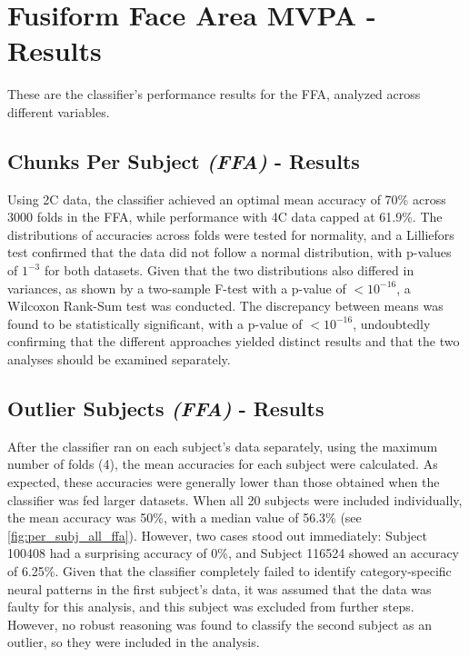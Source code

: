 \section{Fusiform Face Area MVPA - Results}

These are the classifier's performance results for the \gls{FFA}, analyzed across different variables.

\subsection{Chunks Per Subject \textit{(FFA)} - Results}

Using \gls{2C} data, the classifier achieved an optimal mean accuracy of 70\% across 3000 folds in the \gls{FFA}, while performance with \gls{4C} data capped at 61.9\%. The distributions of accuracies across folds were tested for normality, and a Lilliefors test confirmed that the data did not follow a normal distribution, with p-values of $1^{-3}$ for both datasets. Given that the two distributions also differed in variances, as shown by a two-sample F-test with a p-value of $<10^{-16}$, a Wilcoxon Rank-Sum test was conducted. The discrepancy between means was found to be statistically significant, with a p-value of $<10^{-16}$, undoubtedly confirming that the different approaches yielded distinct results and that the two analyses should be examined separately.

\subsection{Outlier Subjects \textit{(FFA)} - Results}
\label{subs:res_outliers_ffa}

After the classifier ran on each subject's data separately, using the maximum number of folds (4), the mean accuracies for each subject were calculated. As expected, these accuracies were generally lower than those obtained when the classifier was fed larger datasets. When all 20 subjects were included individually, the mean accuracy was 50\%, with a median value of 56.3\% (see \autoref{fig:per_subj_all_ffa}). However, two cases stood out immediately: Subject 100408 had a surprising accuracy of 0\%, and Subject 116524 showed an accuracy of 6.25\%. Given that the classifier completely failed to identify category-specific neural patterns in the first subject's data, it was assumed that the data was faulty for this analysis, and this subject was excluded from further steps. However, no robust reasoning was found to classify the second subject as an outlier, so they were included in the analysis.

